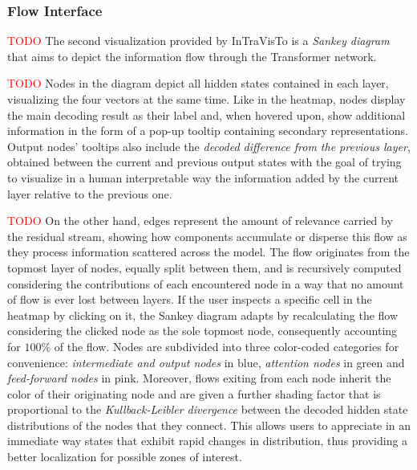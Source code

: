 \documentclass[aspectratio=169, 12pt]{beamer}
\begin{document}
    \subsubsection{Flow Interface}
    \begin{frame}{}
        \textcolor{red}{TODO}
        The second visualization provided by InTraVisTo is a \emph{Sankey diagram} that aims to depict the information flow through the Transformer network.
    \end{frame}

    \begin{frame}{}
        \textcolor{red}{TODO}
        Nodes in the diagram depict all hidden states contained in each layer, visualizing the four vectors at the same time.
        Like in the heatmap, nodes display the main decoding result as their label and, when hovered upon, show additional information in the form of a pop-up tooltip containing secondary representations.
        Output nodes' tooltips also include the \emph{decoded difference from the previous layer}, obtained between the current and previous output states with the goal of trying to visualize in a human interpretable way the information added by the current layer relative to the previous one.
    \end{frame}

    \begin{frame}{}
        \textcolor{red}{TODO}
        On the other hand, edges represent the amount of relevance carried by the residual stream, showing how components accumulate or disperse this flow as they process information scattered across the model.
        The flow originates from the topmost layer of nodes, equally split between them, and is recursively computed considering the contributions of each encountered node in a way that no amount of flow is ever lost between layers.
        If the user inspects a specific cell in the heatmap by clicking on it, the Sankey diagram adapts by recalculating the flow considering the clicked node as the sole topmost node, consequently accounting for $100\%$ of the flow.
        Nodes are subdivided into three color-coded categories for convenience: \emph{intermediate and output nodes} in blue, \emph{attention nodes} in green and \emph{feed-forward nodes} in pink.
        Moreover, flows exiting from each node inherit the color of their originating node and are given a further shading factor that is proportional to the \emph{Kullback-Leibler divergence} between the decoded hidden state distributions of the nodes that they connect.
        This allows users to appreciate in an immediate way states that exhibit rapid changes in distribution, thus providing a better localization for possible zones of interest.
    \end{frame}
\end{document}
